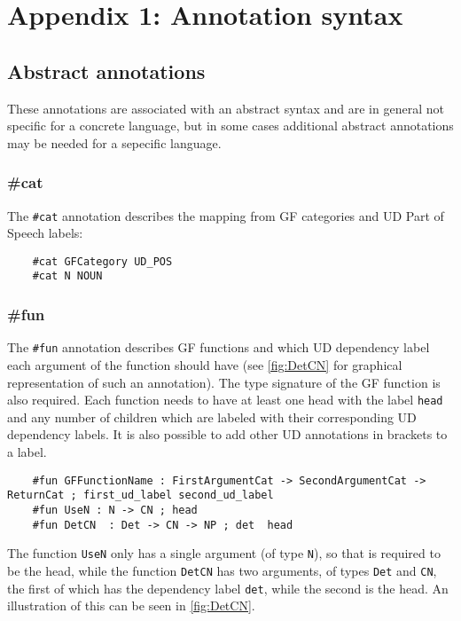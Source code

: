 \chapter{Appendix 1: Annotation syntax}


\section{Abstract annotations}

These annotations are associated with an abstract syntax and are in general not specific for a concrete language, but in some cases additional abstract annotations may be needed for a sepecific language.

\subsection{\#cat}

The \lstinline{#cat} annotation describes the mapping from GF categories and UD Part of Speech labels:

\begin{lstlisting}
    #cat GFCategory UD_POS
    #cat N NOUN
\end{lstlisting}

\subsection{\#fun}

The \lstinline{#fun} annotation describes GF functions and which UD dependency label each argument of the function should have (see \autoref{fig:DetCN} for graphical representation of such an annotation). The type signature of the GF function is also required. Each function needs to have at least one head with the label \lstinline{head} and any number of children which are labeled with their corresponding UD dependency labels. It is also possible to add other UD annotations in brackets to a label.

\begin{lstlisting}
    #fun GFFunctionName : FirstArgumentCat -> SecondArgumentCat -> ReturnCat ; first_ud_label second_ud_label
    #fun UseN : N -> CN ; head
    #fun DetCN  : Det -> CN -> NP ; det  head
\end{lstlisting}

The function \lstinline{UseN} only has a single argument (of type \lstinline{N}), so that is required to be the head, while the function \verb|DetCN| has two arguments, of types \verb|Det| and \verb|CN|, the first of which has the dependency label \verb|det|, while the second is the head. An illustration of this can be seen in \autoref{fig:DetCN}.


